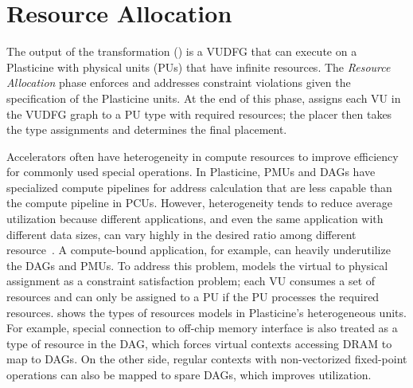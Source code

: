 \section{Resource Allocation} \label{sec:resalloc}

The output of the transformation () is a VUDFG that 
can execute on a Plasticine with physical units (PUs) that have infinite resources.
The \emph{Resource Allocation} phase enforces and addresses constraint violations given 
the specification of the Plasticine units. 
At the end of this phase, \name assigns each VU in the VUDFG graph to a PU type with required
resources; the placer then takes the type assignments and determines the final placement.

Accelerators often have heterogeneity in compute resources to improve efficiency for commonly used
special operations.
In Plasticine, PMUs and DAGs have specialized compute pipelines for address calculation that are 
less capable than the compute pipeline in PCUs.
However, heterogeneity tends to reduce average utilization because different applications, and even the same
application with different data sizes, can vary highly in the desired ratio among different
resource~\cite{tz_rnn}.
A compute-bound application, for example, can heavily underutilize the DAGs and PMUs.
To address this problem, \name models the virtual to physical assignment as a constraint satisfaction problem; 
each VU consumes a set of resources and can only be assigned to a PU if the PU processes the required resources. 
 shows the types of resources \name models in Plasticine's heterogeneous units.
For example, special connection to off-chip memory interface is
also treated as a type of resource in the DAG, which forces virtual contexts accessing DRAM to map to DAGs. 
On the other side, regular contexts with non-vectorized fixed-point operations can also be mapped to
spare DAGs, which improves utilization.
